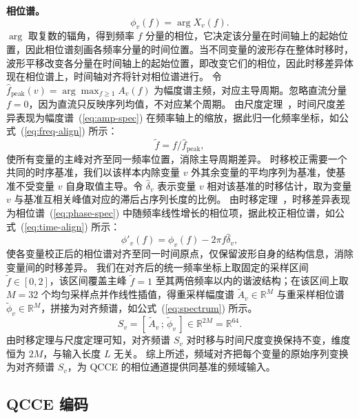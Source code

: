 \textbf{相位谱。}
\begin{equation}
\label{eq:phase-spec}
\phi_v(f) = \arg X_v(f).
\end{equation}
$\arg$ 取复数的辐角，得到频率 $f$ 分量的相位，它决定该分量在时间轴上的起始位置，因此相位谱刻画各频率分量的时间位置。当不同变量的波形存在整体时移时，波形平移改变各分量在时间轴上的起始位置，即改变它们的相位，因此时移差异体现在相位谱上，时间轴对齐将针对相位谱进行。
令 $\hat{f}_{\mathrm{peak}}(v) = \arg\max_{f\geq 1} A_v(f)$ 为幅度谱主频，对应主导周期。忽略直流分量 $f=0$，因为直流只反映序列均值，不对应某个周期。
由尺度定理~\cite{bracewell2000fourier}，时间尺度差异表现为幅度谱~(\ref{eq:amp-spec}) 在频率轴上的缩放，据此归一化频率坐标，如公式~(\ref{eq:freq-align}) 所示：
\begin{equation}
\label{eq:freq-align}
\tilde{f} = f / \hat{f}_{\mathrm{peak}},
\end{equation}
使所有变量的主峰对齐至同一频率位置，消除主导周期差异。
时移校正需要一个共同的时序基准，我们以该样本内除变量 $v$ 外其余变量的平均序列为基准，使基准不受变量 $v$ 自身取值主导。令 $\hat{\delta}_v$ 表示变量 $v$ 相对该基准的时移估计，取为变量 $v$ 与基准互相关峰值对应的滞后占序列长度的比例。
由时移定理~\cite{bracewell2000fourier}，时移差异表现为相位谱~(\ref{eq:phase-spec}) 中随频率线性增长的相位项，据此校正相位谱，如公式~(\ref{eq:time-align}) 所示：
\begin{equation}
\label{eq:time-align}
\phi'_v(f) = \phi_v(f) - 2\pi f\hat{\delta}_v,
\end{equation}
使各变量校正后的相位谱对齐至同一时间原点，仅保留波形自身的结构信息，消除变量间的时移差异。
我们在对齐后的统一频率坐标上取固定的采样区间 $\tilde{f}\in[0,2]$，该区间覆盖主峰 $\tilde{f}=1$ 至其两倍频率以内的谐波结构；在该区间上取 $M = 32$ 个均匀采样点并作线性插值，得重采样幅度谱 $\tilde{A}_v \in \mathbb{R}^M$ 与重采样相位谱 $\tilde{\phi}_v \in \mathbb{R}^M$，拼接为对齐频谱，如公式~(\ref{eq:spectrum}) 所示。
\begin{equation}
\label{eq:spectrum}
S_v = [\,\tilde{A}_v\,;\,\tilde{\phi}_v\,] \in \mathbb{R}^{2M} = \mathbb{R}^{64}.
\end{equation}
由时移定理与尺度定理可知，对齐频谱 $S_v$ 对时移与时间尺度变换保持不变，维度恒为 $2M$，与输入长度 $L$ 无关。
综上所述，频域对齐把每个变量的原始序列变换为对齐频谱 $S_v$，为 QCCE 的相位通道提供同基准的频域输入。

\subsection{QCCE 编码}

